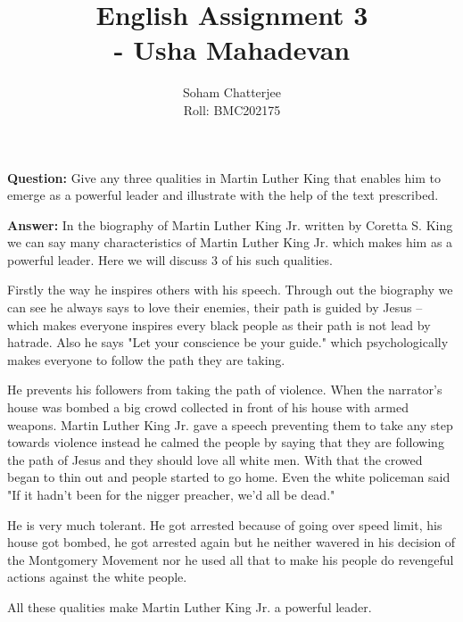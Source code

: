 \documentclass{article}
\title{\huge{English Assignment 3\\\hspace{7cm}- Usha Mahadevan}
}
\author{Soham Chatterjee\\Roll: BMC202175}
\date{}
\begin{document}
	\maketitle\pagebreak
	\textbf{Question:} Give any three qualities in Martin Luther King that enables him to emerge as a powerful  leader and illustrate with the help of the text prescribed.
	
	\textbf{Answer:} In the biography of Martin Luther King Jr. written by Coretta S. King we can say many characteristics of Martin Luther King Jr. which makes him as a powerful leader. Here we will discuss 3 of his such qualities.
	
	Firstly the way he inspires others with his speech. Through out the biography we can see he always says to love their enemies, their path is guided by Jesus -- which makes everyone inspires every black people as their path is not lead by hatrade. Also he says "Let your conscience be your guide." which psychologically makes everyone to follow the path they are taking.
	
	He prevents his followers from taking the path of violence. When the narrator's house was bombed a big crowd collected in front of his house with armed weapons. Martin Luther King Jr. gave a speech preventing them to take any step towards violence instead he calmed the people by saying that they are following the path of Jesus and they should love all white men. With that the crowed began to thin out and people started to go home. Even the white policeman said "If it hadn't been for the nigger preacher, we'd all be dead." 
	
	He is very much tolerant. He got arrested because of going over speed limit, his house got bombed, he got arrested again but he neither wavered in his decision of the Montgomery Movement nor he used all that to make his people do revengeful actions against the white people.
	
	All these qualities make Martin Luther King Jr. a powerful leader.
\end{document}
